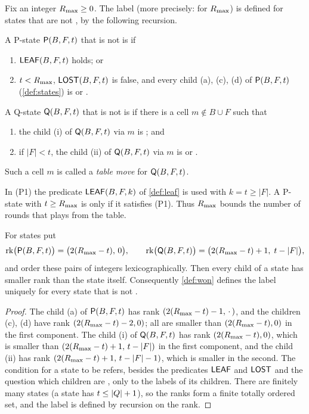 \begin{definition}[\WON]\label{def:won}
Fix an integer $R_{\max}\ge 0$. The label \WON{} (more precisely: \WON{} for $R_{\max}$) is defined for states that
are not \VOID, by the following recursion.

A P-state $\mathsf{P}(B,F,t)$ that is not \VOID{} is \WON{} if
\begin{enumerate}[label=\textup{(P\arabic*)},leftmargin=3em]
\item $\mathsf{LEAF}(B,F,t)$ holds; or
\item $t<R_{\max}$, $\mathsf{LOST}(B,F,t)$ is false, and every child \textup{(a)}, \textup{(c)}, \textup{(d)} of
  $\mathsf{P}(B,F,t)$ (\cref{def:states}) is \WON{} or \VOID.
\end{enumerate}
A Q-state $\mathsf{Q}(B,F,t)$ that is not \VOID{} is \WON{} if there is a cell $m\notin B\cup F$ such that
\begin{enumerate}[label=\textup{(\roman*)},leftmargin=3em]
\item the child \textup{(i)} of $\mathsf{Q}(B,F,t)$ via $m$ is \WON; and
\item if $|F|<t$, the child \textup{(ii)} of $\mathsf{Q}(B,F,t)$ via $m$ is \WON{} or \VOID.
\end{enumerate}
Such a cell $m$ is called a \emph{table move} for $\mathsf{Q}(B,F,t)$.
\end{definition}

In (P1) the predicate $\mathsf{LEAF}(B,F,k)$ of \cref{def:leaf} is used with $k=t\ge|F|$. A P-state with
$t\ge R_{\max}$ is \WON{} only if it satisfies (P1). Thus $R_{\max}$ bounds the number of rounds that \Breaker{} plays
from the table.

\begin{lemma}\label{lem:rank}
For states put
\[ \operatorname{rk}\bigl(\mathsf{P}(B,F,t)\bigr)=\bigl(2(R_{\max}-t),\,0\bigr),\qquad
   \operatorname{rk}\bigl(\mathsf{Q}(B,F,t)\bigr)=\bigl(2(R_{\max}-t)+1,\;t-|F|\bigr), \]
and order these pairs of integers lexicographically. Then every child of a state has smaller rank than the
state itself. Consequently \cref{def:won} defines the label \WON{} uniquely for every state that is
not \VOID.
\end{lemma}

\begin{proof}
The child \textup{(a)} of $\mathsf{P}(B,F,t)$ has rank $(2(R_{\max}-t)-1,\,\cdot\,)$, and the children \textup{(c)},
\textup{(d)} have rank $(2(R_{\max}-t)-2,0)$; all are smaller than $(2(R_{\max}-t),0)$ in the first component. The
child \textup{(i)} of $\mathsf{Q}(B,F,t)$ has rank $(2(R_{\max}-t),0)$, which is smaller than
$(2(R_{\max}-t)+1,\,t-|F|)$ in the first component, and the child \textup{(ii)} has rank
$(2(R_{\max}-t)+1,\,t-|F|-1)$, which is smaller in the second. The condition for a state to be \WON{} refers,
besides the predicates $\mathsf{LEAF}$ and $\mathsf{LOST}$ and the question which children are \VOID, only to the labels of
its children. There are finitely many
states (a state has $t\le|Q|+1$), so the ranks form a finite totally ordered set, and the label is defined by
recursion on the rank.
\end{proof}


